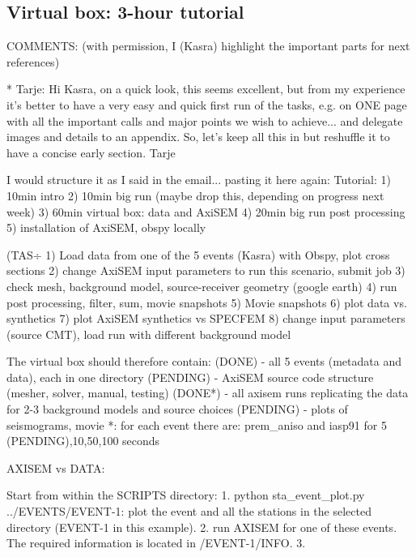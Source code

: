 \subsection{Virtual box: 3-hour tutorial}

COMMENTS: (with permission, I (Kasra) highlight the important parts for next references)

* Tarje:
Hi Kasra, on a quick look, this seems excellent, but from my experience it’s better to have a very easy and quick first run of the tasks, e.g. on ONE page with all the important calls and major points we wish to achieve... and delegate images and details to an appendix. So, let’s keep all this in but reshuffle it to have a concise early section. Tarje

I would structure it as I said in the email... pasting it here again:
Tutorial:
1) 10min intro
2) 10min big run (maybe drop this, depending on progress next week)
3) 60min virtual box: data and AxiSEM
4) 20min big run post processing
5) installation of AxiSEM, obspy locally

(TAS÷
1) Load data from one of the 5 events (Kasra) with Obspy, plot cross sections
2) change AxiSEM input parameters to run this scenario, submit job
3) check mesh, background model, source-receiver geometry (google earth)
4) run post processing, filter, sum, movie snapshots
5) Movie snapshots
6) plot data vs. synthetics
7) plot AxiSEM synthetics vs SPECFEM
8) change input parameters (source CMT), load run with different background model

The virtual box should therefore contain:
(DONE)        - all 5 events (metadata and data), each in one directory 
(PENDING) - AxiSEM source code structure (mesher, solver, manual, testing)
(DONE*)       - all axisem runs replicating the data for 2-3 background models and source choices
(PENDING)  - plots of seismograms, movie 
*: for each event there are: prem\_aniso and iasp91 for 5 (PENDING),10,50,100 seconds



AXISEM vs DATA:


Start from within the SCRIPTS directory:
1. python sta\_event\_plot.py ../EVENTS/EVENT-1: plot the event and all the stations in the selected directory (EVENT-1 in this example).
2. run AXISEM for one of these events. The required information is located in /EVENT-1/INFO.
3. 



































